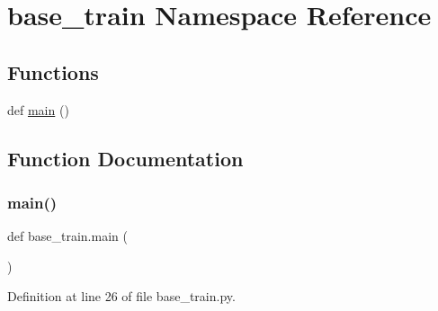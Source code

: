 \hypertarget{namespacebase__train}{}\section{base\+\_\+train Namespace Reference}
\label{namespacebase__train}
\subsection*{Functions}
\begin{DoxyCompactItemize}
\item 
def \hyperlink{namespacebase__train_afacf60925509c7e52f77f41e331261f3}{main} ()
\end{DoxyCompactItemize}


\subsection{Function Documentation}
\mbox{\label{namespacebase__train_afacf60925509c7e52f77f41e331261f3}} 
\subsubsection{\texorpdfstring{main()}{main()}}
{\footnotesize\ttfamily def base\+\_\+train.\+main (\begin{DoxyParamCaption}{ }\end{DoxyParamCaption})}



Definition at line 26 of file base\+\_\+train.\+py.


